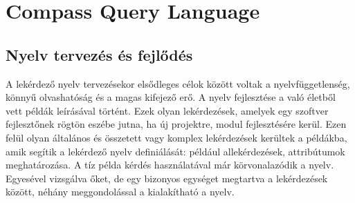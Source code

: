 \documentclass[a4paper,12pt]{report}
\begin{document}
\chapter{Compass Query Language}
\section{Nyelv tervezés és fejlődés}
A lekérdező nyelv tervezésekor elsődleges célok között voltak a nyelvfüggetlenség, könnyű olvashatóság és a magas kifejező erő. A nyelv fejlesztése a való életből vett példák leírásával történt. Ezek olyan lekérdezések, amelyek egy szoftver fejlesztőnek rögtön eszébe jutna, ha új projektre, modul fejlesztésére kerül. Ezen felül olyan általános és összetett vagy komplex lekérdezések kerültek a példákba, amik segítik a lekérdező nyelv definiálását: például allekérdezések, attribútumok meghatározása. A tíz példa kérdés használatával már körvonalazódik a nyelv. Egyesével vizsgálva őket, de egy bizonyos egységet megtartva a lekérdezések között, néhány meggondolással a kialakítható a nyelv.
\end{document}
